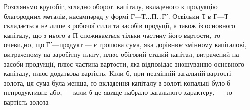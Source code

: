 Розгляньмо кругобіг, зглядно оборот, капіталу, вкладеного в продукцію
благородних металів, насамперед у формі $Г — Т\dots{} П\dots{} Г'$. Оскільки
Т в $Г — Т$ складається не лише з робочої сили та засобів продуції, а також
із основного капіталу, що з нього в П споживається тільки частину
його вартости, то очевидно, що $Г' — п$родукт — є грошова сума, яка
дорівнює змінному капіталові, витраченому на заробітну плату, плюс обіговий
сталий капітал, витрачений на засоби продукції, плюс частина
вартости, яка відповідає зношуванню основного капіталу, плюс додаткова
вартість. Коли б, при незмінній загальній вартості золота, ця сума була
менша, то вкладення капіталу в золоті копальні було б непродуктивне
або, — коли б це явище набрало загального характеру, — то вартість золота
\parbreak{}  %
